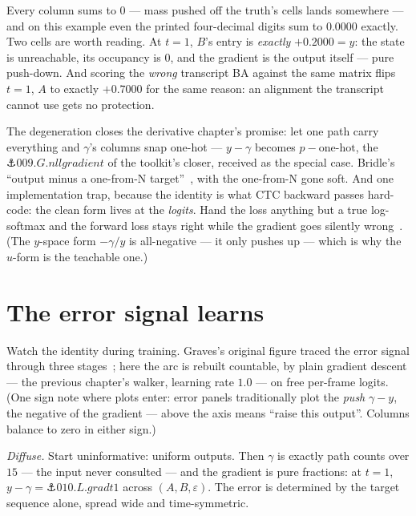 \begin{narrative}
Every column sums to $0$ — mass pushed off the truth's cells lands
somewhere — and on this example even the printed four-decimal digits
sum to $0.0000$ exactly. Two cells are worth reading. At $t = 1$,
$B$'s entry is \emph{exactly} $+0.2000 = y$: the state is
unreachable, its occupancy is $0$, and the gradient is the output
itself — pure push-down. And scoring the \emph{wrong} transcript BA
against the same matrix flips $t{=}1$, $A$ to exactly $+0.7000$ for
the same reason: an alignment the transcript cannot use gets no
protection.

The degeneration closes the derivative chapter's promise: let one
path carry everything and $\gamma$'s columns snap one-hot —
$y - \gamma$ becomes $p - \text{one-hot}$, the
$\anchor{009.G.nllgradient}$ of the toolkit's closer, received as
the special case. Bridle's ``output minus a one-from-N
target''~\cite{probability-john-s-bridle-training-stochastic-model-recognition-nips-198},
with the one-from-N gone soft. And one implementation trap, because
the identity is what CTC backward passes hard-code: the clean form
lives at the \emph{logits}. Hand the loss anything but a true
log-softmax and the forward loss stays right while the gradient goes
silently
wrong~\cite{deep_learning-pytorch-issue-122243-non-normalized-ctc-inputs}.
(The $y$-space form $-\gamma/y$ is all-negative — it only pushes up —
which is why the $u$-form is the teachable one.)

\section{The error signal learns}

Watch the identity during training. Graves's original figure traced
the error signal through three
stages~\cite{deep_learning-graves-et-al-2006-connectionist-temporal-classification};
here the arc is rebuilt countable, by plain gradient descent — the
previous chapter's walker, learning rate $1.0$ — on free per-frame
logits. (One sign note where plots enter: error panels traditionally
plot the \emph{push} $\gamma - y$, the negative of the gradient —
above the axis means ``raise this output''. Columns balance to zero
in either sign.)

\emph{Diffuse.} Start uninformative: uniform outputs. Then $\gamma$
is exactly path counts over $15$ — the input never consulted — and
the gradient is pure fractions: at $t = 1$,
$y - \gamma = \anchor{010.L.gradt1}$ across $(A, B, \varepsilon)$.
The error is determined by the target sequence alone, spread wide
and time-symmetric.


\end{narrative}
